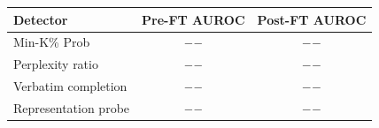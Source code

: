 \begin{tabular}{lcc}
\toprule
Detector & Pre-FT AUROC & Post-FT AUROC \\
\midrule
Min-K\% Prob              & $--$ & $--$ \\
Perplexity ratio          & $--$ & $--$ \\
Verbatim completion       & $--$ & $--$ \\
Representation probe      & $--$ & $--$ \\
\bottomrule
\end{tabular}
